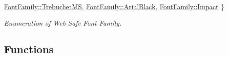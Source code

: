 \begin{DoxyCompactItemize}
\newline
\mbox{\hyperlink{namespacevegra_a342c4e8c946c4f729d694257d1ed876ba59b2d6b423cfc293af6522c3d2806199}{Font\+Family\+::\+Trebuchet\+MS}}, 
\mbox{\hyperlink{namespacevegra_a342c4e8c946c4f729d694257d1ed876ba90c2472318c987dd8c65516ce3b7a614}{Font\+Family\+::\+Arial\+Black}}, 
\mbox{\hyperlink{namespacevegra_a342c4e8c946c4f729d694257d1ed876ba21f59b54f62b5b8b4bc0f63f0f617fc1}{Font\+Family\+::\+Impact}}
 \}
\begin{DoxyCompactList}\small\item\em Enumeration of Web Safe Font Family. \end{DoxyCompactList}\end{DoxyCompactItemize}
\subsection*{Functions}
